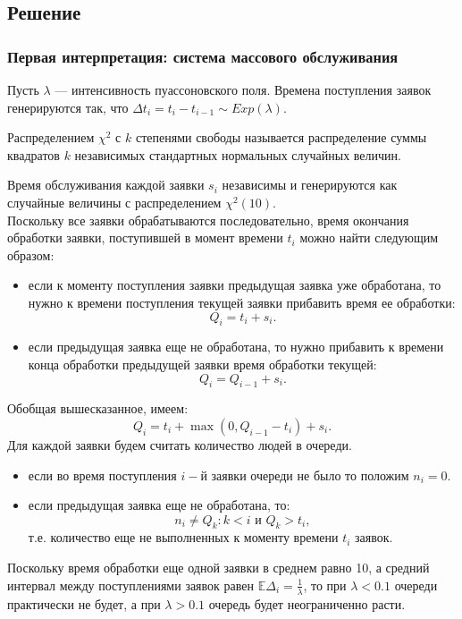 \documentclass[11pt]{article}
\begin{document}
\subsection{Решение}
\subsubsection{Первая интерпретация: система массового обслуживания}
Пусть $\lambda$ --- интенсивность пуассоновского поля. Времена поступления заявок генерируются так, что $\Delta t_i = t_i - t_{i-1} \sim Exp(\lambda).$
\begin{opr}
	Распределением $\chi^2$ с $k$ степенями свободы называется распределение суммы квадратов $k$ независимых стандартных нормальных случайных величин.
\end{opr}
Время обслуживания каждой заявки $s_i$ независимы и генерируются как случайные величины с распределением $\chi^2(10)$.\\
Поскольку все заявки обрабатываются последовательно, время окончания обработки заявки, поступившей в момент времени $t_i$ можно найти следующим образом:
\begin{itemize}
	\item если к моменту поступления заявки предыдущая заявка уже обработана, то нужно к времени поступления текущей заявки прибавить время ее обработки:
	\[ Q_i = t_i + s_i. \]
	\item если предыдущая заявка еще не обработана, то нужно прибавить к времени конца обработки предыдущей заявки время обработки текущей:
	\[ Q_i = Q_{i-1} + s_i. \]
\end{itemize}
Обобщая вышесказанное, имеем:
\[ Q_i = t_i + \max (0,Q_{i-1} - t_i) + s_i. \]
Для каждой заявки будем считать количество людей в очереди.
\begin{itemize}
	\item если во время поступления $i-$й заявки очереди не было то положим $n_i = 0$.
	\item если предыдущая заявка еще не обработана, то:
	\[ n_i \neq Q_k: k < i \text{ и } Q_k > t_i, \]
	т.е. количество еще не выполненных к моменту времени $t_i$ заявок.
\end{itemize}
Поскольку время обработки еще одной заявки в среднем равно 10, а средний интервал между поступлениями заявок равен $\mathbb{E}\Delta_i = \frac{1}{\lambda}$, то при $\lambda < 0.1$ очереди практически не будет, а при $\lambda > 0.1$ очередь будет неограниченно расти.
\end{document}
